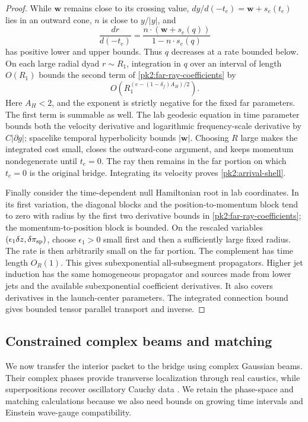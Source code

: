 \begin{proof}
While $\mathbf w$ remains close to its crossing value,
$dy/d(-t_e)=\mathbf w+s_e(t_e)$ lies in an outward cone, $n$ is
close to $y/|y|$, and
\[
 \frac{dr}{d(-t_e)}
  =\frac{n\cdot(\mathbf w+s_e(q))}{1-n\cdot s_e(q)}
\]
has positive lower and upper bounds. Thus $q$ decreases at a rate
bounded below. On each large radial dyad $r\sim R_1$, integration
in $q$ over an interval of length $O(R_1)$ bounds the second term
of \eqref{pk2:far-ray-coefficients} by
\[
 O\left(R_1^{(e-(1-\delta_f)A_H)/2}\right).
\]
Here $A_H<2$, and the exponent is strictly negative for the fixed
far parameters. The first term is summable as well. The lab
geodesic equation in time parameter bounds both the velocity
derivative and logarithmic frequency-scale derivative by
$C|\partial g|$; spacelike temporal hyperbolicity bounds
$|\mathbf w|$. Choosing $R$ large makes the integrated cost small,
closes the outward-cone argument, and keeps momentum nondegenerate
until $t_e=0$. The ray then remains in the far portion on which
$t_e=0$ is the original bridge. Integrating its velocity proves
\eqref{pk2:arrival-shell}.

Finally consider the time-dependent null Hamiltonian root in lab
coordinates. In its first variation, the diagonal blocks and the
position-to-momentum block tend to zero with radius by the first
two derivative bounds in \eqref{pk2:far-ray-coefficients}; the
momentum-to-position block is bounded. On the rescaled variables
$(\epsilon_1\delta z,\delta\pi_{\rm sp})$, choose $\epsilon_1>0$
small first and then a sufficiently large fixed radius. The rate
is then arbitrarily small on the far portion. The complement has
time length $O_R(1)$. This gives subexponential all-subsegment
propagators. Higher jet induction has the same homogeneous
propagator and sources made from lower jets and the available
subexponential coefficient derivatives. It also covers derivatives
in the launch-center parameters. The integrated connection bound
gives bounded tensor parallel transport and inverse.
\end{proof}

\subsection{Constrained complex beams and matching}
\label{pk2:beams}

We now transfer the interior packet to the bridge using complex
Gaussian beams. Their complex phases provide transverse localization
through real caustics, while superpositions recover oscillatory Cauchy
data \cite{Ralston1982,Tanushev2008,LiuRunborgTanushev2013}.
We retain the phase-space and matching calculations because we also need
bounds on growing time intervals and Einstein wave-gauge compatibility.

